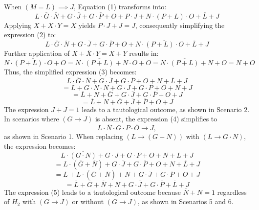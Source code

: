 When \((M = L) \implies J\), Equation (1) transforms into:
\[
L \cdot \overline{G} \cdot \overline{N} + G \cdot \overline{J} + G \cdot \overline{P} + O + P \cdot J + N \cdot \overline{(P + L) \cdot O} + \overline{L} + J \tag{2}
\]
Applying \(X + X \cdot Y = X\) yields \(P \cdot J + J = J\), consequently simplifying the expression (2) to:
\[
L \cdot \overline{G} \cdot \overline{N} + G \cdot \overline{J} + G \cdot \overline{P} + O + N \cdot \overline{(P + L) \cdot O} + \overline{L} + J \tag{3}
\]
Further application of \(X + \overline{X} \cdot Y = X + Y\) results in:
\[
N \cdot \overline{(P + L) \cdot O} + O = N \cdot \overline{(P + L)} + N \cdot \overline{O} + O = N \cdot \overline{(P + L)} + N + O = N + O
\]
Thus, the simplified expression (3) becomes:
\[
L \cdot \overline{G} \cdot \overline{N} + G \cdot \overline{J} + G \cdot \overline{P} + O + N + \overline{L} + J \tag{4}
\]
\[
= \overline{L} + G \cdot \overline{N} \cdot \overline{N} + G \cdot \overline{J} + G \cdot \overline{P} + O + N + J
\]
\[
= \overline{L} + N + \overline{G} + G \cdot \overline{J} + G \cdot \overline{P} + O + J
\]
\[
= \overline{L} + N + \overline{G} + \overline{J} + \overline{P} + O + J
\]
The expression \(\overline{J} + J = 1\) leads to a tautological outcome, as shown in Scenario 2. In scenarios where \((G \to J)\) is absent, the expression (4) simplifies to
\[
L \cdot \overline{N} \cdot G \cdot P \cdot \overline{O} \to J,
\]
as shown in Scenario 1. When replacing \((L \to (G + N))\) with \((L \to G \cdot N)\), the expression becomes:
\[
L \cdot \overline{(G \cdot N)} + G \cdot \overline{J} + G \cdot \overline{P} + O + N + \overline{L} + J
\]
\[
= L \cdot (\overline{G} + \overline{N}) + G \cdot \overline{J} + G \cdot \overline{P} + O + N + \overline{L} + J
\]
\[
= \overline{L} + L \cdot (\overline{G} + \overline{N}) + N + G \cdot \overline{J} + G \cdot \overline{P} + O + J
\]
\[
= \overline{L} + \overline{G} + \overline{N} + N + G \cdot \overline{J} + G \cdot \overline{P} + \overline{L} + J \tag{5}
\]
The expression (5) leads to a tautological outcome because \(\overline{N} + N = 1\) regardless of \(H_2\) with \((G \to J)\) or without \((G \to J)\), as shown in Scenarios 5 and 6.

